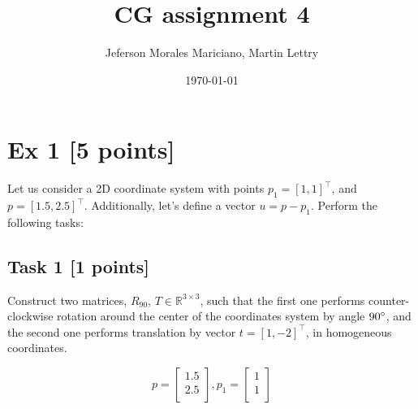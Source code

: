 \documentclass{article}
\title{CG assignment 4}
\author{Jeferson Morales Mariciano, Martin Lettry}
\date{\today}
\begin{document}
\maketitle

\section*{Ex 1 [5 points]}
Let us consider a 2D coordinate system with points $p_1 = [1, 1]^\intercal$,
and $p = [1.5, 2.5]^\intercal$.
Additionally, let's define a vector $u = p - p_1$.
Perform the following tasks:

\subsection*{Task 1 [1 points]}
Construct two matrices, $R_{90}$, $T \in \mathbb{R}^{3 \times 3}$,
such that the first one performs counter-clockwise rotation around
the center of the coordinates system by angle $90 \degree$, and the second one performs translation
by vector $t = [1, -2]^\intercal$, in homogeneous coordinates.

\[
    p =
    \begin{bmatrix}
        1.5 \\ 2.5 \\
    \end{bmatrix}
    , p_1 =
    \begin{bmatrix}
        1 \\ 1 \\
    \end{bmatrix}
\]
\end{document}
